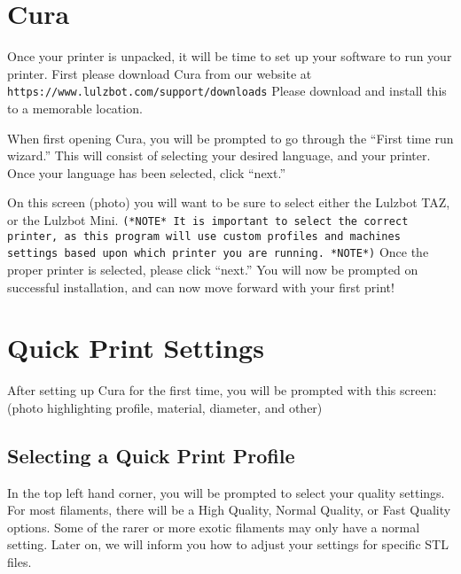 %
%
%
%
%

\section{Cura}

Once your printer is unpacked, it will be time to set up your software to run your printer. First please download Cura from our website at  \texttt{https://www.lulzbot.com/support/downloads} Please download and install this to a memorable location. 

When first opening Cura, you will be prompted to go through the “First time run wizard.” This will consist of selecting your desired language, and your printer. Once your language has been selected, click “next.”

On this screen (photo)  you will want to be sure to select either the Lulzbot TAZ, or the Lulzbot Mini. \texttt{(*NOTE* It is important to select the correct printer, as this program will use custom profiles and machines settings based upon which printer you are running. *NOTE*)} Once the proper printer is selected, please click “next.” You will now be prompted on successful installation, and can now move forward with your first print!

\section{Quick Print Settings}

After setting up Cura for the first time, you will be prompted with this screen: (photo highlighting profile, material, diameter, and other)

\subsection{Selecting a Quick Print Profile}

In the top left hand corner, you will be prompted to select your quality settings. For most filaments, there will be a High Quality, Normal Quality, or Fast Quality options. Some of the rarer or more exotic filaments may only have a normal setting. Later on, we will inform you how to adjust your settings for specific STL files.


